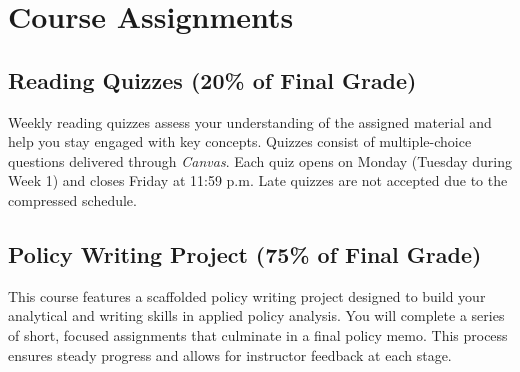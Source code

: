 \documentclass[11pt, letterpaper]{article}
\begin{document}
\section{Course Assignments}

\subsection*{Reading Quizzes (20\% of Final Grade)}
Weekly reading quizzes assess your understanding of the assigned material and help you stay engaged with key concepts. Quizzes consist of multiple-choice questions delivered through \emph{Canvas}. Each quiz opens on Monday (Tuesday during Week 1) and closes Friday at 11:59 p.m. Late quizzes are not accepted due to the compressed schedule.

\subsection*{Policy Writing Project (75\% of Final Grade)}
This course features a scaffolded policy writing project designed to build your analytical and writing skills in applied policy analysis. You will complete a series of short, focused assignments that culminate in a final policy memo. This process ensures steady progress and allows for instructor feedback at each stage.
\end{document}
